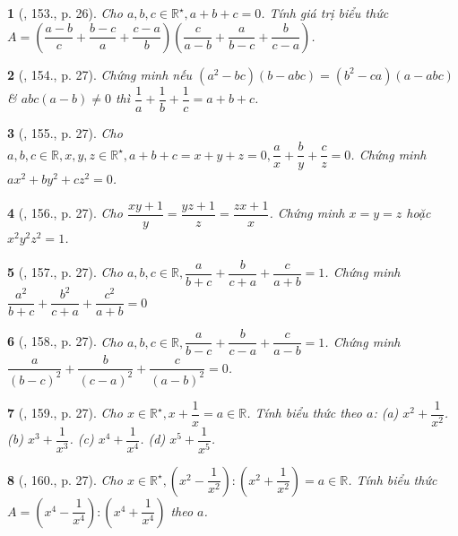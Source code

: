 \documentclass{article}
\newtheorem{baitoan}{}
\begin{document}
\begin{baitoan}[\cite{Binh_Toan_8_tap_1}, 153., p. 26]
	Cho $a,b,c\in\mathbb{R}^\star,a + b + c = 0$. Tính giá trị biểu thức $A = \left(\dfrac{a - b}{c} + \dfrac{b - c}{a} + \dfrac{c - a}{b}\right)\left(\dfrac{c}{a - b} + \dfrac{a}{b - c} + \dfrac{b}{c - a}\right)$.
\end{baitoan}

\begin{baitoan}[\cite{Binh_Toan_8_tap_1}, 154., p. 27]
	Chứng minh nếu $(a^2 - bc)(b - abc) = (b^2 - ca)(a - abc)$ \& $abc(a - b)\ne0$ thì $\dfrac{1}{a} + \dfrac{1}{b} + \dfrac{1}{c} = a + b + c$.
\end{baitoan}

\begin{baitoan}[\cite{Binh_Toan_8_tap_1}, 155., p. 27]
	Cho $a,b,c\in\mathbb{R},x,y,z\in\mathbb{R}^\star,a + b + c = x + y + z = 0,\dfrac{a}{x} + \dfrac{b}{y} + \dfrac{c}{z} = 0$. Chứng minh $ax^2 + by^2 + cz^2 = 0$.
\end{baitoan}

\begin{baitoan}[\cite{Binh_Toan_8_tap_1}, 156., p. 27]
	Cho $\dfrac{xy + 1}{y} = \dfrac{yz + 1}{z} = \dfrac{zx + 1}{x}$. Chứng minh $x = y = z$ hoặc $x^2y^2z^2 = 1$.
\end{baitoan}

\begin{baitoan}[\cite{Binh_Toan_8_tap_1}, 157., p. 27]
	Cho $a,b,c\in\mathbb{R},\dfrac{a}{b + c} + \dfrac{b}{c + a} + \dfrac{c}{a + b} = 1$. Chứng minh $\dfrac{a^2}{b + c} + \dfrac{b^2}{c + a} + \dfrac{c^2}{a + b} = 0$
\end{baitoan}

\begin{baitoan}[\cite{Binh_Toan_8_tap_1}, 158., p. 27]
	Cho $a,b,c\in\mathbb{R},\dfrac{a}{b - c} + \dfrac{b}{c - a} + \dfrac{c}{a - b} = 1$. Chứng minh $\dfrac{a}{(b - c)^2} + \dfrac{b}{(c - a)^2} + \dfrac{c}{(a - b)^2} = 0$.
\end{baitoan}

\begin{baitoan}[\cite{Binh_Toan_8_tap_1}, 159., p. 27]
	Cho $x\in\mathbb{R}^\star,x + \dfrac{1}{x} = a\in\mathbb{R}$. Tính biểu thức theo $a$: (a) $x^2 + \dfrac{1}{x^2}$. (b) $x^3 + \dfrac{1}{x^3}$. (c) $x^4 + \dfrac{1}{x^4}$. (d) $x^5 + \dfrac{1}{x^5}$.
\end{baitoan}

\begin{baitoan}[\cite{Binh_Toan_8_tap_1}, 160., p. 27]
	Cho $x\in\mathbb{R}^\star,\left(x^2 - \dfrac{1}{x^2}\right):\left(x^2 + \dfrac{1}{x^2}\right) = a\in\mathbb{R}$. Tính biểu thức $A = \left(x^4 - \dfrac{1}{x^4}\right):\left(x^4 + \dfrac{1}{x^4}\right)$ theo $a$.
\end{baitoan}
\end{document}
